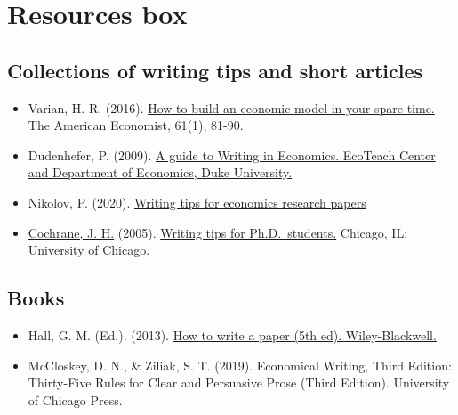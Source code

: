 \documentclass[
]{book}
\providecommand{\tightlist}{%
  \setlength{\itemsep}{0pt}\setlength{\parskip}{0pt}}
\begin{document}
\hypertarget{resources-box-5}{%
\section{Resources box}\label{resources-box-5}}

\hypertarget{collections-of-writing-tips-and-short-articles}{%
\subsection{Collections of writing tips and short
articles}\label{collections-of-writing-tips-and-short-articles}}

\begin{itemize}
\tightlist
\item
  Varian, H. R. (2016).
  \href{https://journals.sagepub.com/doi/pdf/10.1177/0569434515627089}{How
  to build an economic model in your spare time.} The American
  Economist, 61(1), 81-90.
\item
  Dudenhefer, P. (2009).
  \href{https://econ.duke.edu/sites/econ.duke.edu/files/file-attachments/Dudenhefer\%2C\%20Paul\%20-\%20Guide\%20to\%20Writing\%20in\%20Economics.pdf}{A
  guide to Writing in Economics. EcoTeach Center and Department of
  Economics, Duke University.}
\item
  Nikolov, P. (2020).
  \href{http://www.people.fas.harvard.edu/~pnikolov/resources/writingtips.pdf}{Writing
  tips for economics research papers}
\item
  \href{https://www.johnhcochrane.com/}{Cochrane, J. H.} (2005).
  \href{http://mayoral.iae-csic.org/timeseries_bgse13/phd_paper_writing.pdf}{Writing
  tips for Ph.D.~students.} Chicago, IL: University of Chicago.
\end{itemize}

\hypertarget{books}{%
\subsection{Books}\label{books}}

\begin{itemize}
\tightlist
\item
  Hall, G. M. (Ed.). (2013).
  \href{https://onlinelibrary.wiley.com/doi/book/10.1002/9781118488713}{How
  to write a paper (5th ed). Wiley-Blackwell.}
\item
  McCloskey, D. N., \& Ziliak, S. T. (2019). Economical Writing, Third
  Edition: Thirty-Five Rules for Clear and Persuasive Prose (Third
  Edition). University of Chicago Press.
\end{itemize}
\end{document}
